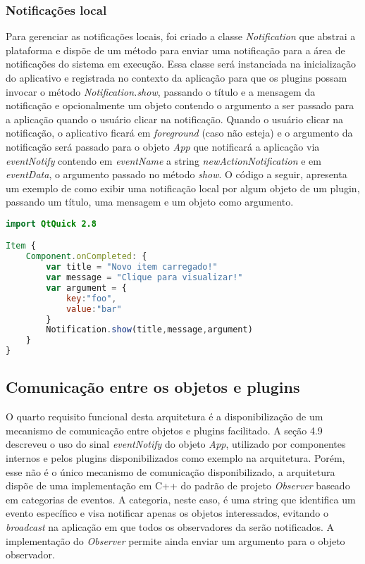 \subsubsection{Notificações local}
Para gerenciar as notificações locais, foi criado a classe \textit{Notification} que abstrai a plataforma e dispõe de um método para enviar uma notificação para a área de notificações do sistema em execução. Essa classe será instanciada na inicialização do aplicativo e registrada no contexto da aplicação para que os plugins possam invocar o método \textit{Notification.show}, passando o título e a mensagem da notificação e opcionalmente um objeto contendo o argumento a ser passado para a aplicação quando o usuário clicar na notificação. Quando o usuário clicar na notificação, o aplicativo ficará em \textit{foreground} (caso não esteja) e o argumento da notificação será passado para o objeto \textit{App} que notificará a aplicação via \textit{eventNotify} contendo em \textit{eventName} a string \textit{newActionNotification} e em \textit{eventData}, o argumento passado no método \textit{show}. O código a seguir, apresenta um exemplo de como exibir uma notificação local por algum objeto de um plugin, passando um título, uma mensagem e um objeto como argumento.

\begin{center}
\begin{lstlisting}[language=qml]
import QtQuick 2.8

Item {
    Component.onCompleted: {
		var title = "Novo item carregado!"
		var message = "Clique para visualizar!"
		var argument = {
			key:"foo",
			value:"bar"
		}
		Notification.show(title,message,argument)
	}
}
\end{lstlisting}
\end{center}


\subsection{Comunicação entre os objetos e plugins}
O quarto requisito funcional desta arquitetura é a disponibilização de um mecanismo de comunicação entre objetos e plugins facilitado. A seção 4.9 descreveu o uso do sinal \textit{eventNotify} do objeto \textit{App}, utilizado por componentes internos e pelos plugins disponibilizados como exemplo na arquitetura. Porém, esse não é o único mecanismo de comunicação disponibilizado, a arquitetura dispõe de uma implementação em C++ do padrão de projeto \textit{Observer} baseado em categorias de eventos. A categoria, neste caso, é uma string que identifica um evento específico e visa notificar apenas os objetos interessados, evitando o \textit{broadcast} na aplicação em que todos os observadores da serão notificados. A implementação do \textit{Observer} permite ainda enviar um argumento para o objeto observador.\par

